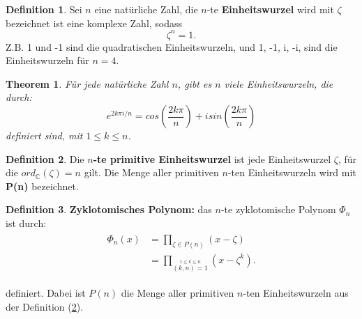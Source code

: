 \documentclass[12pt,oneside]{article}
\newtheorem{theorem}{Theorem}[section]
\theoremstyle{remark}
\theoremstyle{definition}
\newtheorem{definition}{Definition}[section]
\begin{document}
\begin{definition}
Sei $n$ eine natürliche Zahl, die $n$-te \textbf{Einheitswurzel} wird mit $\zeta$ bezeichnet ist eine komplexe Zahl, sodass
\begin{equation}
    \zeta^n = 1.
\end{equation}
Z.B. 1 und -1 sind die quadratischen Einheitswurzeln, und 1, -1, i, -i, sind die Einheitswurzeln für $n = 4$.    
\end{definition}

\smallskip

\begin{theorem}
Für jede natürliche Zahl $n$, gibt es $n$ viele Einheitswurzeln, die durch:\newline
\begin{equation}
    e^{2k\pi i/n} = cos(\frac{2k \pi }{n}) + i sin(\frac{2k \pi}{n})
\end{equation}
definiert sind, mit $1 \leq k \leq n$.
\end{theorem}

\smallskip


\smallskip

\begin{definition}\label{prim_ein}
Die \textbf{$n$-te primitive Einheitswurzel} ist jede Einheitswurzel $\zeta$, für die $ord_{\mathbb{C}}(\zeta) = n $ gilt. Die Menge aller primitiven $n$-ten Einheitswurzeln wird mit \textbf{P(n)} bezeichnet. 
\end{definition}

\smallskip

\begin{definition}\label{def_cyc_poly}
\textbf{Zyklotomisches Polynom:} das $n$-te zyklotomische Polynom $\Phi_{n}$ ist durch:\newline
\begin{equation}
    \begin{split}
        \begin{aligned}
            \Phi_{n}(x) &= \prod_{\zeta \in P(n)} (x -\zeta) \\
            &= \prod _{\stackrel {1\leq k\leq n}{(k,n)=1}}\left(x- \zeta^k\right).
        \end{aligned}
    \end{split}
\end{equation}

definiert. Dabei ist $P(n)$ die Menge aller primitiven $n$-ten Einheitswurzeln aus der Definition (\ref{prim_ein}). 
\end{definition}
\end{document}
